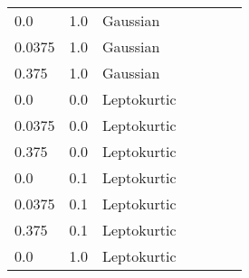\begin{table}[]
\begin{tabular}{p{}|p{}|p{}|p{}|p{}|p{}|p{}}
0.0                        & 1.0                                   & Gaussian         &                      &                            &                                         &                                       \\
0.0375                     & 1.0                                   & Gaussian         &                      &                            &                                         &                                       \\
0.375                      & 1.0                                   & Gaussian         &                      &                            &                                         &                                       \\ \hline
0.0                        & 0.0                                   & Leptokurtic      &                      &                            &                                         &                                       \\
0.0375                     & 0.0                                   & Leptokurtic      &                      &                            &                                         &                                       \\
0.375                      & 0.0                                   & Leptokurtic      &                      &                            &                                         &                                       \\ \hline
0.0                        & 0.1                                   & Leptokurtic      &                      &                            &                                         &                                       \\
0.0375                     & 0.1                                   & Leptokurtic      &                      &                            &                                         &                                       \\
0.375                      & 0.1                                   & Leptokurtic      &                      &                            &                                         &                                       \\ \hline
0.0                        & 1.0                                   & Leptokurtic      &                      &                            &                                         &                                       \\

\end{tabular}
\end{table}
